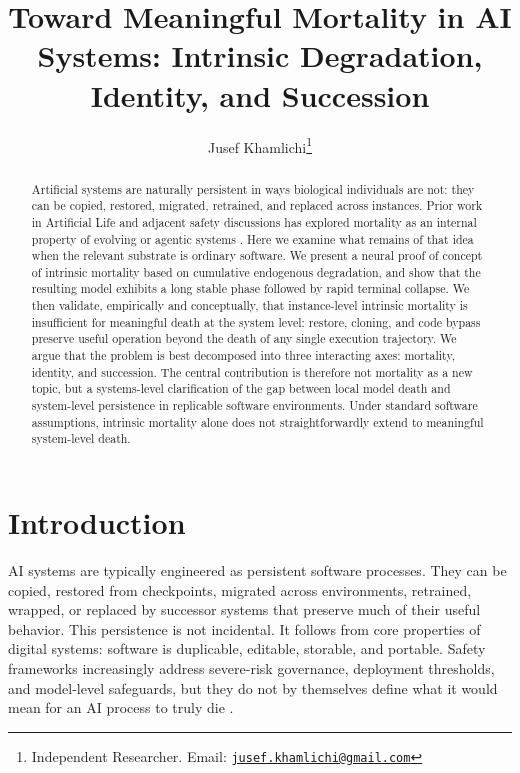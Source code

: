 \documentclass[11pt]{article}
\title{Toward Meaningful Mortality in AI Systems: Intrinsic Degradation, Identity, and Succession}
\author{Jusef Khamlichi\thanks{Independent Researcher. Email: \href{mailto:jusef.khamlichi@gmail.com}{\texttt{jusef.khamlichi@gmail.com}}}}
\date{}
\begin{document}
\maketitle

\begin{abstract}
Artificial systems are naturally persistent in ways biological individuals are not: they can be copied, restored, migrated, retrained, and replaced across instances. Prior work in Artificial Life and adjacent safety discussions has explored mortality as an internal property of evolving or agentic systems \cite{veenstra2020,harvey2024motivations,harvey2024ai}. Here we examine what remains of that idea when the relevant substrate is ordinary software. We present a neural proof of concept of intrinsic mortality based on cumulative endogenous degradation, and show that the resulting model exhibits a long stable phase followed by rapid terminal collapse. We then validate, empirically and conceptually, that instance-level intrinsic mortality is insufficient for meaningful death at the system level: restore, cloning, and code bypass preserve useful operation beyond the death of any single execution trajectory. We argue that the problem is best decomposed into three interacting axes: mortality, identity, and succession. The central contribution is therefore not mortality as a new topic, but a systems-level clarification of the gap between local model death and system-level persistence in replicable software environments. Under standard software assumptions, intrinsic mortality alone does not straightforwardly extend to meaningful system-level death.
\end{abstract}

\newpage
\section{Introduction}

AI systems are typically engineered as persistent software processes. They can be copied, restored from checkpoints, migrated across environments, retrained, wrapped, or replaced by successor systems that preserve much of their useful behavior. This persistence is not incidental. It follows from core properties of digital systems: software is duplicable, editable, storable, and portable. Safety frameworks increasingly address severe-risk governance, deployment thresholds, and model-level safeguards, but they do not by themselves define what it would mean for an AI process to truly die \cite{nist-airmf,openai-preparedness}.
\end{document}
